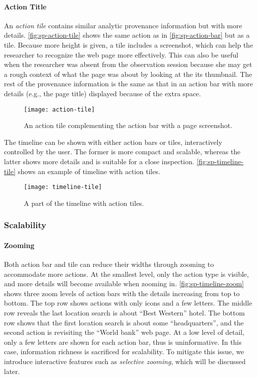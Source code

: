 \paragraph{Action Title}
An \emph{action tile} contains similar analytic provenance information but with more details. \autoref{fig:sp-action-tile} shows the same action as in \autoref{fig:sp-action-bar} but as a tile. Because more height is given, a tile includes a screenshot, which can help the researcher to recognize the web page more effectively. This can also be useful when the researcher was absent from the observation session because she may get a rough context of what the page was about by looking at the its thumbnail. The rest of the provenance information is the same as that in an action bar with more details (e.g., the page title) displayed because of the extra space.

\begin{figure}
\centering
\texttt{[image: action-tile]}
\caption[An action tile]{An action tile complementing the action bar with a page screenshot.}
\label{fig:sp-action-tile}
\end{figure}

The timeline can be shown with either action bars or tiles, interactively controlled by the user. The former is more compact and scalable, whereas the latter shows more details and is suitable for a close inspection. \autoref{fig:sp-timeline-tile} shows an example of timeline with action tiles.

\begin{figure}
\centering
\texttt{[image: timeline-tile]}
\caption{A part of the timeline with action tiles.}
\label{fig:sp-timeline-tile}
\end{figure}

\subsubsection{Scalability}
\paragraph{Zooming}
Both action bar and tile can reduce their widths through zooming to accommodate more actions. At the smallest level, only the action type is visible, and more details will become available when zooming in. \autoref{fig:sp-timeline-zoom} shows three zoom levels of action bars with the details increasing from top to bottom. The top row shows actions with only icons and a few letters. The middle row reveals the last location search is about ``Best Western'' hotel. The bottom row shows that the first location search is about some ``headquarters'', and the second action is revisiting the ``World bank'' web page. At a low level of detail, only a few letters are shown for each action bar, thus is uninformative. In this case, information richness is sacrificed for scalability. To mitigate this issue, we introduce interactive features such as \emph{selective zooming}, which will be discussed later.

